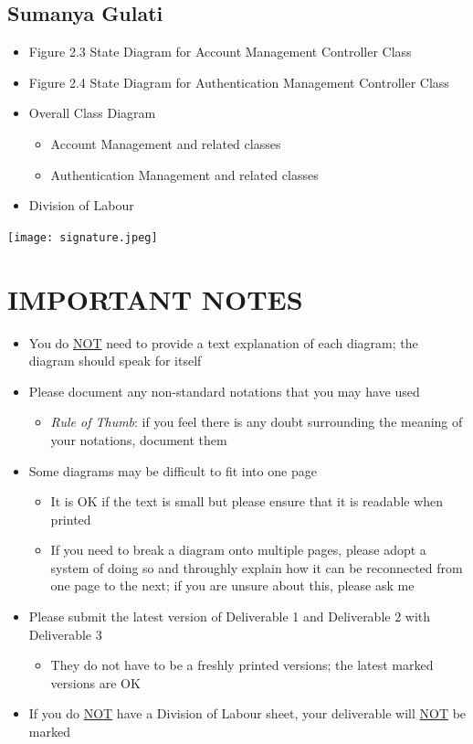 \documentclass[]{article}
\begin{document}
\subsection{Sumanya Gulati}
\label{subsec:sumanya_gulati}
\begin{itemize}
	\item Figure 2.3 State Diagram for Account Management Controller Class
 	\item Figure 2.4 State Diagram for Authentication Management Controller Class
	\item Overall Class Diagram
 		\begin{itemize}
   			\item Account Management and related classes
      			\item Authentication Management and related classes
      		\end{itemize}
	\item Division of Labour
\end{itemize}
\texttt{[image: signature.jpeg]}

\newpage
\section*{IMPORTANT NOTES}
\begin{itemize}
	\item You do \underline{NOT} need to provide a text explanation of each diagram; the diagram should speak for itself
	\item Please document any non-standard notations that you may have used
	\begin{itemize}
		\item \emph{Rule of Thumb}: if you feel there is any doubt surrounding the meaning of your notations, document them
	\end{itemize}
	\item Some diagrams may be difficult to fit into one page
	\begin{itemize}
		\item It is OK if the text is small but please ensure that it is readable when printed
		\item If you need to break a diagram onto multiple pages, please adopt a system of doing so and throughly explain how it can be reconnected from one page to the next; if you are unsure about this, please ask me
	\end{itemize}
	\item Please submit the latest version of Deliverable 1 and Deliverable 2 with Deliverable 3
	\begin{itemize}
		\item They do not have to be a freshly printed versions; the latest marked versions are OK
	\end{itemize}
	\item If you do \underline{NOT} have a Division of Labour sheet, your deliverable will \underline{NOT} be marked
\end{itemize}
\end{document}
